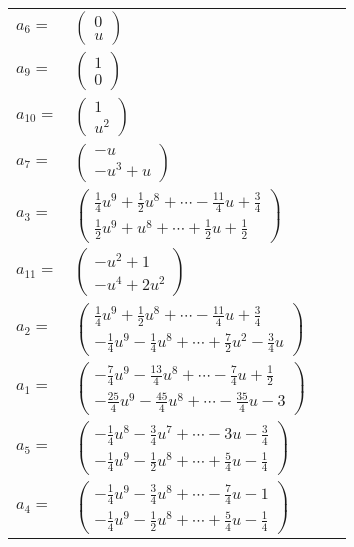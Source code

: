 \documentclass[1p]{elsarticle_modified}
\theoremstyle{definition}
\begin{document}
\begin{tabular}{m{7pt} m{180pt} m{7pt} m{180pt} }
\flushright $a_{6}=$&$\begin{pmatrix}0\\u\end{pmatrix}$ \\
\flushright $a_{9}=$&$\begin{pmatrix}1\\0\end{pmatrix}$ \\
\flushright $a_{10}=$&$\begin{pmatrix}1\\u^2\end{pmatrix}$ \\
\flushright $a_{7}=$&$\begin{pmatrix}- u\\- u^3+u\end{pmatrix}$ \\
\flushright $a_{3}=$&$\begin{pmatrix}\frac{1}{4} u^9+\frac{1}{2} u^8+\cdots-\frac{11}{4} u+\frac{3}{4}\\\frac{1}{2} u^9+u^8+\cdots+\frac{1}{2} u+\frac{1}{2}\end{pmatrix}$ \\
\flushright $a_{11}=$&$\begin{pmatrix}- u^2+1\\- u^4+2 u^2\end{pmatrix}$ \\
\flushright $a_{2}=$&$\begin{pmatrix}\frac{1}{4} u^9+\frac{1}{2} u^8+\cdots-\frac{11}{4} u+\frac{3}{4}\\-\frac{1}{4} u^9-\frac{1}{4} u^8+\cdots+\frac{7}{2} u^2-\frac{3}{4} u\end{pmatrix}$ \\
\flushright $a_{1}=$&$\begin{pmatrix}-\frac{7}{4} u^9-\frac{13}{4} u^8+\cdots-\frac{7}{4} u+\frac{1}{2}\\-\frac{25}{4} u^9-\frac{45}{4} u^8+\cdots-\frac{35}{4} u-3\end{pmatrix}$ \\
\flushright $a_{5}=$&$\begin{pmatrix}-\frac{1}{4} u^8-\frac{3}{4} u^7+\cdots-3 u-\frac{3}{4}\\-\frac{1}{4} u^9-\frac{1}{2} u^8+\cdots+\frac{5}{4} u-\frac{1}{4}\end{pmatrix}$ \\
\flushright $a_{4}=$&$\begin{pmatrix}-\frac{1}{4} u^9-\frac{3}{4} u^8+\cdots-\frac{7}{4} u-1\\-\frac{1}{4} u^9-\frac{1}{2} u^8+\cdots+\frac{5}{4} u-\frac{1}{4}\end{pmatrix}$ \\

\end{tabular}
\end{document}
